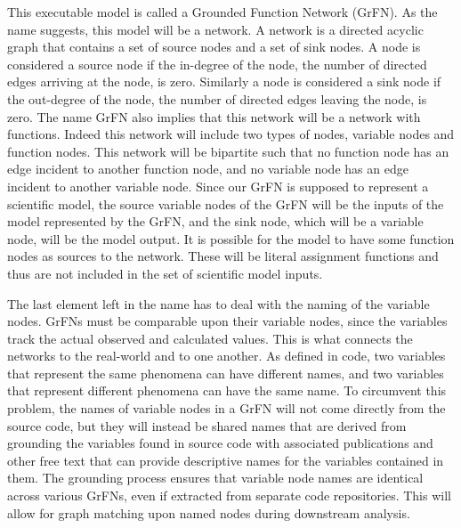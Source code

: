 This executable model is called a Grounded Function Network (GrFN).
As the name suggests, this model will be a network.
A network is a directed acyclic graph that contains a set of source nodes and a set of sink nodes.
A node is considered a source node if the in-degree of the node, the number of directed edges arriving at the node, is zero.
Similarly a node is considered a sink node if the out-degree of the node, the number of directed edges leaving the node, is zero.
The name GrFN also implies that this network will be a network with functions.
Indeed this network will include two types of nodes, variable nodes and function nodes.
This network will be bipartite such that no function node has an edge incident to another function node, and no variable node has an edge incident to another variable node.
Since our GrFN is supposed to represent a scientific model, the source variable nodes of the GrFN will be the inputs of the model represented by the GrFN, and the sink node, which will be a variable node, will be the model output.
It is possible for the model to have some function nodes as sources to the network. These will be literal assignment functions and thus are not included in the set of scientific model inputs.

The last element left in the name has to deal with the naming of the variable nodes.
GrFNs must be comparable upon their variable nodes, since the variables track the actual observed and calculated values.
This is what connects the networks to the real-world and to one another.
As defined in code, two variables that represent the same phenomena can have different names, and two variables that represent different phenomena can have the same name.
To circumvent this problem, the names of variable nodes in a GrFN will not come directly from the source code, but they will instead be shared names that are derived from grounding the variables found in source code with associated publications and other free text that can provide descriptive names for the variables contained in them.
The grounding process ensures that variable node names are identical across various GrFNs, even if extracted from separate code repositories.
This will allow for graph matching upon named nodes during downstream analysis.

